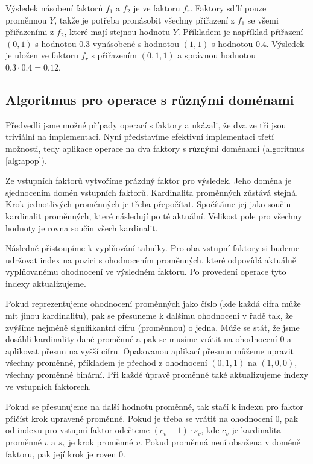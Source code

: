 Výsledek násobení faktorů $f_1$ a $f_2$ je ve faktoru $f_r$.
Faktory sdílí pouze proměnnou $Y$, takže je potřeba pronásobit všechny přiřazení z $f_1$ se všemi přiřazeními z $f_2$, které mají stejnou hodnotu $Y$.
Příkladem je například přiřazení $(0, 1)$ s hodnotou $0.3$ vynásobené s hodnotou $(1, 1)$ s hodnotou $0.4$.
Výsledek je uložen ve faktoru $f_r$ s přiřazením $(0, 1, 1)$ a správnou hodnotou $0.3 \cdot 0.4 = 0.12$.

\subsection{Algoritmus pro operace s různými doménami}

Předvedli jsme možné případy operací s faktory a ukázali, že dva ze tří jsou triviální na implementaci.
Nyní představíme efektivní implementaci třetí možnosti, tedy aplikace operace na dva faktory s různými doménami (algoritmus \ref{alg:apop}).

Ze vstupních faktorů vytvoříme prázdný faktor pro výsledek.
Jeho doména je sjednocením domén vstupních faktorů.
Kardinalita proměnných zůstává stejná.
Krok jednotlivých proměnných je třeba přepočítat.
Spočítáme jej jako součin kardinalit proměnných, které následují po té aktuální.
Velikost pole pro všechny hodnoty je rovna součin všech kardinalit.

Následně přistoupíme k vyplňování tabulky.
Pro oba vstupní faktory si budeme udržovat index na pozici s ohodnocením proměnných, které odpovídá aktuálně vyplňovanému ohodnocení ve výsledném faktoru.
Po provedení operace tyto indexy aktualizujeme.

Pokud reprezentujeme ohodnocení proměnných jako číslo (kde každá cifra může mít jinou kardinalitu), pak se přesuneme k dalšímu ohodnocení v řadě tak, že zvýšíme nejméně signifikantní cifru (proměnnou) o jedna.
Může se stát, že jsme dosáhli kardinality dané proměnné a pak se musíme vrátit na ohodnocení 0 a aplikovat přesun na vyšší cifru.
Opakovanou aplikací přesunu můžeme upravit všechny proměnné, příkladem je přechod z ohodnocení $(0, 1, 1)$ na $(1, 0, 0)$, všechny proměnné binární.
Při každé úpravě proměnné také aktualizujeme indexy ve vstupních faktorech.

Pokud se přesunujeme na další hodnotu proměnné, tak stačí k indexu pro faktor přičíst krok upravené proměnné.
Pokud je třeba se vrátit na ohodnocení 0, pak od indexu pro vstupní faktor odečteme $(c_v - 1) \cdot s_v$, kde $c_v$ je kardinalita proměnné $v$ a $s_v$ je krok proměnné $v$.
Pokud proměnná není obsažena v doméně faktoru, pak její krok je roven 0.

